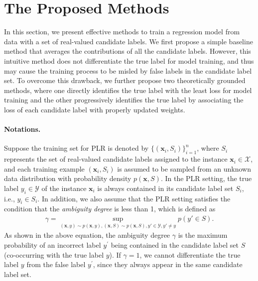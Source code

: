 \documentclass[letterpaper]{article} %
\begin{document}
\section{The Proposed Methods}
In this section, we present effective methods to train a regression model from data with a set of real-valued candidate labels. We first propose a simple baseline method that averages the contributions of all the candidate labels. However, this intuitive method does not differentiate the true label for model training, and thus may cause the training process to be misled by false labels in the candidate label set. To overcome this drawback, we further propose two theoretically grounded methods, where one directly identifies the true label with the least loss for model training and the other progressively identifies the true label by associating the loss of each candidate label with properly updated weights.
\paragraph{Notations.} Suppose the training set for PLR is denoted by $\{(\bm{x}_i,S_i)\}_{i=1}^n$, where $S_i$ represents the set of real-valued candidate labels assigned to the instance $\bm{x}_i\in\mathcal{X}$, and each training example $(\bm{x}_i, S_i)$ is assumed to be sampled from an unknown data distribution with probability density $p(\bm{x}, S)$. In the PLR setting, the true label $y_i\in\mathcal{Y}$ of the instance $\bm{x}_i$ is always contained in its candidate label set $S_i$, i.e., $y_i\in S_i$. In addition, we also assume that the PLR setting satisfies the condition that the \emph{ambiguity degree} \cite{cour2011learning} is less than 1, which is defined as
\begin{gather}
\nonumber
\gamma = \sup_{(\bm{x},y)\sim p(\bm{x},y),(\bm{x},S)\sim p(\bm{x},S),y' \in \mathcal{Y},y' \neq y} p(y' \in S).
\end{gather}
As shown in the above equation, the ambiguity degree $\gamma$ is the maximum probability of an incorrect label $y^\prime$ being contained in the candidate label set $S$ (co-occurring with the true label $y$). If $\gamma=1$, we cannot differentiate the true label $y$ from the false label $y^\prime$, since they always appear in the same candidate label set.
\end{document}
